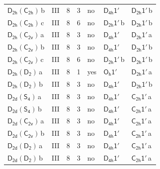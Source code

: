 \documentclass[10pt,a4paper]{article}
\numberwithin{equation}{section}
\newcommand{\grp}[1]{\mathsf{#1}}
\newcommand{\clsletter}[1]{\,{\scriptsize\color{black!55}#1}}
\begin{document}
{\begin{longtable}{@{}llrrlll@{}}
\href{D2h-C2h.pdf}{$\grp{D_{2h}}(\grp{C_{2h}})$}\clsletter{b} & III & 8 & 3 & no & \href{D4h-1p.pdf}{$\grp{D_{4h}1'}$} & \href{D2h-1p.pdf}{$\grp{D_{2h}1'}$}\clsletter{b}\\
\href{D2h-C2h.pdf}{$\grp{D_{2h}}(\grp{C_{2h}})$}\clsletter{c} & III & 8 & 6 & no & \href{D2h-1p.pdf}{$\grp{D_{2h}1'}$}\clsletter{b} & \href{D2h-1p.pdf}{$\grp{D_{2h}1'}$}\clsletter{b}\\
\href{D2h-C2v.pdf}{$\grp{D_{2h}}(\grp{C_{2v}})$}\clsletter{a} & III & 8 & 3 & no & \href{D4h-1p.pdf}{$\grp{D_{4h}1'}$} & \href{D2h-1p.pdf}{$\grp{D_{2h}1'}$}\clsletter{a}\\
\href{D2h-C2v.pdf}{$\grp{D_{2h}}(\grp{C_{2v}})$}\clsletter{b} & III & 8 & 3 & no & \href{D4h-1p.pdf}{$\grp{D_{4h}1'}$} & \href{D2h-1p.pdf}{$\grp{D_{2h}1'}$}\clsletter{b}\\
\href{D2h-C2v.pdf}{$\grp{D_{2h}}(\grp{C_{2v}})$}\clsletter{c} & III & 8 & 6 & no & \href{D2h-1p.pdf}{$\grp{D_{2h}1'}$}\clsletter{b} & \href{D2h-1p.pdf}{$\grp{D_{2h}1'}$}\clsletter{b}\\
\href{D2h-D2.pdf}{$\grp{D_{2h}}(\grp{D_{2}})$}\clsletter{a} & III & 8 & 1 & yes & \href{Oh-1p.pdf}{$\grp{O_{h}1'}$} & \href{D2h-1p.pdf}{$\grp{D_{2h}1'}$}\clsletter{a}\\
\href{D2h-D2.pdf}{$\grp{D_{2h}}(\grp{D_{2}})$}\clsletter{b} & III & 8 & 3 & no & \href{D4h-1p.pdf}{$\grp{D_{4h}1'}$} & \href{D2h-1p.pdf}{$\grp{D_{2h}1'}$}\clsletter{b}\\
\href{D2d-S4.pdf}{$\grp{D_{2d}}(\grp{S_{4}})$}\clsletter{a} & III & 8 & 3 & no & \href{D4h-1p.pdf}{$\grp{D_{4h}1'}$} & \href{C2h-1p.pdf}{$\grp{C_{2h}1'}$}\clsletter{a}\\
\href{D2d-S4.pdf}{$\grp{D_{2d}}(\grp{S_{4}})$}\clsletter{b} & III & 8 & 3 & no & \href{D4h-1p.pdf}{$\grp{D_{4h}1'}$} & \href{C2h-1p.pdf}{$\grp{C_{2h}1'}$}\clsletter{a}\\
\href{D2d-C2v.pdf}{$\grp{D_{2d}}(\grp{C_{2v}})$}\clsletter{a} & III & 8 & 3 & no & \href{D4h-1p.pdf}{$\grp{D_{4h}1'}$} & \href{C2h-1p.pdf}{$\grp{C_{2h}1'}$}\clsletter{a}\\
\href{D2d-C2v.pdf}{$\grp{D_{2d}}(\grp{C_{2v}})$}\clsletter{b} & III & 8 & 3 & no & \href{D4h-1p.pdf}{$\grp{D_{4h}1'}$} & \href{C2h-1p.pdf}{$\grp{C_{2h}1'}$}\clsletter{a}\\
\href{D2d-D2.pdf}{$\grp{D_{2d}}(\grp{D_{2}})$}\clsletter{a} & III & 8 & 3 & no & \href{D4h-1p.pdf}{$\grp{D_{4h}1'}$} & \href{C2h-1p.pdf}{$\grp{C_{2h}1'}$}\clsletter{a}\\
\href{D2d-D2.pdf}{$\grp{D_{2d}}(\grp{D_{2}})$}\clsletter{b} & III & 8 & 3 & no & \href{D4h-1p.pdf}{$\grp{D_{4h}1'}$} & \href{C2h-1p.pdf}{$\grp{C_{2h}1'}$}\clsletter{a}\\

\end{longtable}}
\end{document}
